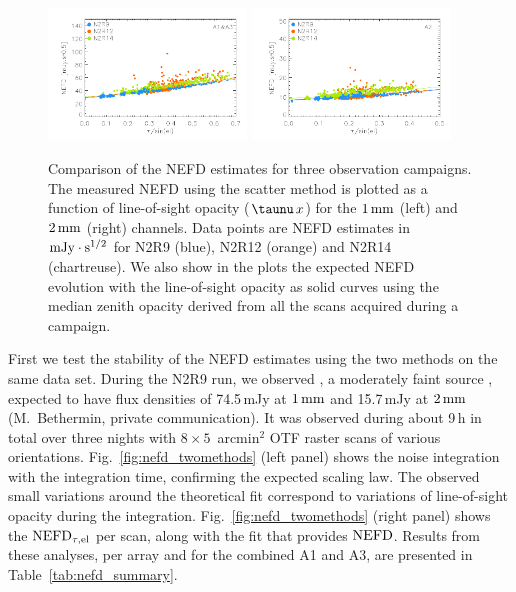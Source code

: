 \begin{figure}[!thbp]
\begin{center}
\includegraphics[clip=true,width=0.47\textwidth]{Figures/plot_nefd_vs_obstau_corrected_skydip_vfinal_1mm.pdf}
\includegraphics[clip=true,width=0.47\textwidth]{Figures/plot_nefd_vs_obstau_corrected_skydip_vfinal_a2.pdf}
\caption{Comparison of the NEFD estimates for three observation
  campaigns. The measured NEFD using the scatter method is plotted as a function of
  line-of-sight opacity ($\taunu\,x$) for the $1\,\rm{mm}$ (left) and $2\,\rm{mm}$ (right)
  channels. Data points are NEFD estimates in $\rm{mJy}\cdot s^{1/2}$ for N2R9 (blue), N2R12 (orange)
  and N2R14 (chartreuse). We also show in the plots the expected NEFD evolution
  with the line-of-sight opacity as solid curves using the median
  zenith opacity derived from all the scans acquired during a campaign.}
\label{fig:nefdvsbackground_below_1Jy}
\end{center}
\end{figure}

First we test the stability of the NEFD estimates using the two methods on the
same data set. During the N2R9 run, we observed \hls, a moderately faint source
\citep{2012A&A...538L...4C}, expected to have flux densities of 74.5\,mJy at
$1\,\rm{mm}$ and 15.7\,mJy at $2\,\rm{mm}$ (M.~Bethermin, private
communication). It was observed during about 9\,h in total over three nights
with $8 \times 5$~arcmin$^2$ OTF raster scans of various
orientations. Fig.~\ref{fig:nefd_twomethods} (left panel) shows the noise
integration with the integration time, confirming the expected scaling law. The
observed small variations around the theoretical fit correspond to variations of
line-of-sight opacity during the integration. Fig.~\ref{fig:nefd_twomethods}
(right panel) shows the $\rm{NEFD}_{\tau,el}$ per scan, along with the fit that
provides $\rm{NEFD}$. Results from these analyses, per array and for the
combined A1 and A3, are presented in Table~\ref{tab:nefd_summary}.

